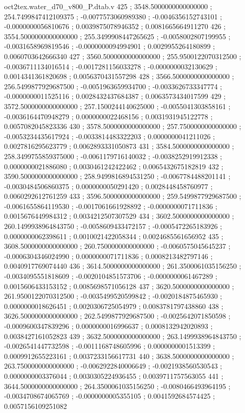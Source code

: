 \begin{filecontents}[overwrite]{oct2tex.water_d70_v800_P.dtab.v}
425 ; 3548.5000000000000000 ; 254.7499847412109375 ; -0.0077573060989380 ; -0.0046356152743101 ; -0.0000000056810676 ; 0.0039875078946352 ; 0.0081665664911270
426 ; 3554.5000000000000000 ; 255.3499908447265625 ; -0.0058002807199955 ; -0.0031658969819546 ; -0.0000000094994901 ; 0.0029955264180899 ; 0.0060703642666340
427 ; 3560.5000000000000000 ; 255.9500122070312500 ; -0.0036711134016514 ; -0.0017281156033278 ; -0.0000000032130629 ; 0.0014341361820698 ; 0.0056370431557298
428 ; 3566.5000000000000000 ; 256.5499877929687500 ; -0.0051963659934700 ; -0.0033626733347774 ; -0.0000000011525116 ; 0.0028432437684387 ; 0.0063573434017599
429 ; 3572.5000000000000000 ; 257.1500244140625000 ; -0.0055041303858161 ; -0.0036164470948279 ; 0.0000000022468156 ; 0.0031931945122778 ; 0.0057082045823336
430 ; 3578.5000000000000000 ; 257.7500000000000000 ; -0.0053234435617924 ; -0.0033814483322203 ; 0.0000000041211026 ; 0.0027816295623779 ; 0.0062893331050873
431 ; 3584.5000000000000000 ; 258.3499755859375000 ; -0.0061179716140032 ; -0.0038252919912338 ; 0.0000000021886080 ; 0.0030461242422462 ; 0.0065432675182819
432 ; 3590.5000000000000000 ; 258.9499816894531250 ; -0.0067784488201141 ; -0.0030484506860375 ; 0.0000000050291420 ; 0.0028448458760977 ; 0.0060292612761259
433 ; 3596.5000000000000000 ; 259.5499877929687500 ; -0.0061655864119530 ; -0.0017061661928892 ; -0.0000000071711836 ; 0.0015676449984312 ; 0.0034212507307529
434 ; 3602.5000000000000000 ; 260.1499938964843750 ; -0.0058609433472157 ; -0.0005472265183926 ; 0.0000000062398611 ; 0.0010021422058344 ; 0.0024685561656952
435 ; 3608.5000000000000000 ; 260.7500000000000000 ; -0.0060575045645237 ; -0.0006304346024990 ; 0.0000000071711836 ; 0.0008213482797146 ; 0.0040917769074440
436 ; 3614.5000000000000000 ; 261.3500061035156250 ; -0.0034095551818609 ; -0.0020104851573706 ; -0.0000000061467289 ; 0.0015606433153152 ; 0.0085698571056128
437 ; 3620.5000000000000000 ; 261.9500122070312500 ; -0.0035499520599842 ; -0.0020184875465930 ; 0.0000000018626451 ; 0.0020306725054979 ; 0.0083781797438860
438 ; 3626.5000000000000000 ; 262.5499877929687500 ; -0.0025642071850598 ; -0.0009600347839296 ; 0.0000000016996637 ; 0.0008132942020893 ; 0.0038427161052823
439 ; 3632.5000000000000000 ; 263.1499938964843750 ; -0.0026541447732598 ; -0.0011168748605996 ; 0.0000000001513399 ; 0.0009912655223161 ; 0.0037233156617731
440 ; 3638.5000000000000000 ; 263.7500000000000000 ; -0.0062922840006649 ; -0.0021938560530543 ; 0.0000000003376044 ; 0.0030305224936455 ; 0.0039711757563055
441 ; 3644.5000000000000000 ; 264.3500061035156250 ; -0.0080466493964195 ; -0.0034708674065769 ; -0.0000000005355105 ; 0.0041592684574425 ; 0.0057156109251082

\end{filecontents}
